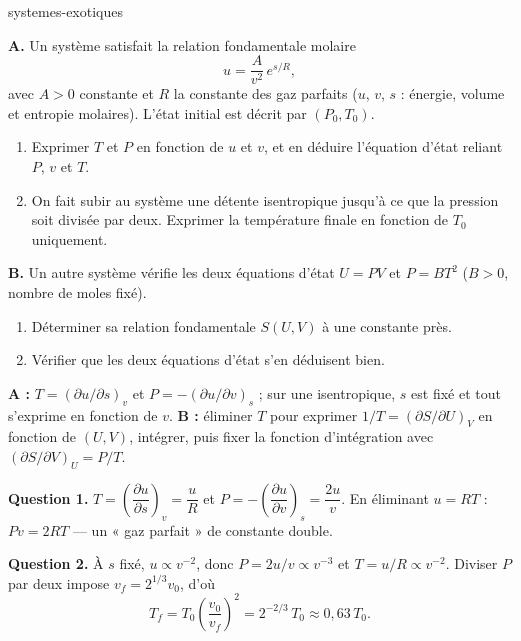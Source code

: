 \begin{exo}{systemes-exotiques}

\textbf{A.} Un système satisfait la relation fondamentale molaire
\[
u = \frac{A}{v^2}\,e^{s/R},
\]
avec $A > 0$ constante et $R$ la constante des gaz parfaits ($u$, $v$, $s$ : énergie, volume et entropie molaires). L'état initial est décrit par $(P_0, T_0)$.

\begin{enumerate}
\item Exprimer $T$ et $P$ en fonction de $u$ et $v$, et en déduire l'équation d'état reliant $P$, $v$ et $T$.
\item On fait subir au système une détente isentropique jusqu'à ce que la pression soit divisée par deux. Exprimer la température finale en fonction de $T_0$ uniquement.
\end{enumerate}

\textbf{B.} Un autre système vérifie les deux équations d'état $U = PV$ et $P = BT^2$ ($B > 0$, nombre de moles fixé).

\begin{enumerate}
\item[3.] Déterminer sa relation fondamentale $S(U,V)$ à une constante près.
\item[4.] Vérifier que les deux équations d'état s'en déduisent bien.
\end{enumerate}

\begin{indication}
\textbf{A :} $T = \left(\partial u/\partial s\right)_v$ et $P = -\left(\partial u/\partial v\right)_s$ ; sur une isentropique, $s$ est fixé et tout s'exprime en fonction de $v$. \textbf{B :} éliminer $T$ pour exprimer $1/T = \left(\partial S/\partial U\right)_V$ en fonction de $(U,V)$, intégrer, puis fixer la fonction d'intégration avec $\left(\partial S/\partial V\right)_U = P/T$.
\end{indication}

\begin{solution}
\textbf{Question 1.} $T = \left(\dfrac{\partial u}{\partial s}\right)_v = \dfrac{u}{R}$ et $P = -\left(\dfrac{\partial u}{\partial v}\right)_s = \dfrac{2u}{v}$. En éliminant $u = RT$ : $Pv = 2RT$ — un « gaz parfait » de constante double.

\textbf{Question 2.} À $s$ fixé, $u \propto v^{-2}$, donc $P = 2u/v \propto v^{-3}$ et $T = u/R \propto v^{-2}$. Diviser $P$ par deux impose $v_f = 2^{1/3}v_0$, d'où
\[
T_f = T_0\left(\frac{v_0}{v_f}\right)^{2} = 2^{-2/3}\,T_0 \approx 0{,}63\,T_0.
\]


\end{solution}
\end{exo}
